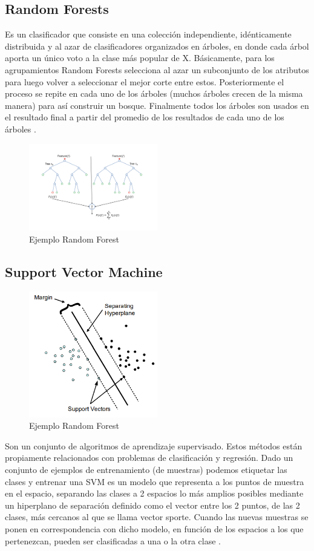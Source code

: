 \documentclass[11pt]{report}
\begin{document}
\subsection {Random Forests}
Es un clasificador que consiste en una colección independiente, idénticamente distribuida y al azar de clasificadores organizados en árboles, en donde cada árbol aporta un único voto a la clase más popular de X. Básicamente, para los agrupamientos Random Forests selecciona al azar un subconjunto de los atributos para luego volver a seleccionar el mejor corte entre estos. Posteriormente el proceso se repite en cada uno de los árboles (muchos árboles crecen de la misma manera) para así construir un bosque. Finalmente todos los árboles son usados en el resultado final a partir del promedio de los resultados de cada uno de los árboles \cite{ApplicationHAR}.
\begin{figure}[h]
  \centering
    \includegraphics[width=0.5\textwidth]{random}
   \caption{Ejemplo Random Forest \cite{randomf}}
\end{figure}  
\subsection {Support Vector Machine}
\begin{figure}[h]
  \centering
    \includegraphics[width=0.5\textwidth]{support}
   \caption{Ejemplo Random Forest \cite{supportv}}
\end{figure}
Son un conjunto de algoritmos de aprendizaje supervisado. Estos métodos están propiamente relacionados con problemas de clasificación y regresión. Dado un conjunto de ejemplos de entrenamiento (de muestras) podemos etiquetar las clases y entrenar una SVM es un modelo que representa a los puntos de muestra en el espacio, separando las clases a 2 espacios lo más amplios posibles mediante un hiperplano de separación definido como el vector entre los 2 puntos, de las 2 clases, más cercanos al que se llama vector sporte. Cuando las nuevas muestras se ponen en correspondencia con dicho modelo, en función de los espacios a los que pertenezcan, pueden ser clasificadas a una o la otra clase \cite{ApplicationHAR}.
 

\end{document}

